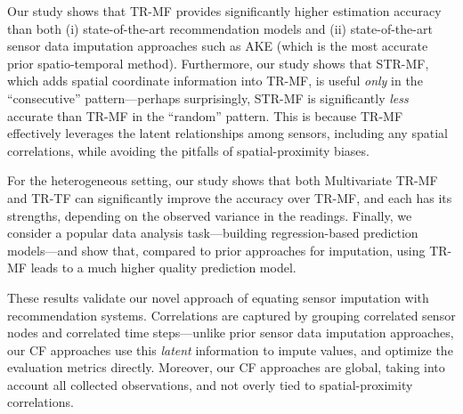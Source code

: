 Our study shows that TR-MF provides significantly higher estimation accuracy than 
both (i) state-of-the-art recommendation models and (ii) state-of-the-art sensor data imputation approaches 
such as AKE (which is the most accurate prior spatio-temporal method).
Furthermore, our study shows that STR-MF, which adds spatial coordinate information into TR-MF, 
is useful {\em only} in the ``consecutive'' pattern---perhaps surprisingly,
STR-MF is significantly {\em less} accurate than TR-MF in the ``random'' pattern.  This is because TR-MF
effectively leverages the latent relationships among sensors, including any spatial correlations, while avoiding the
pitfalls of spatial-proximity biases.

For the heterogeneous setting, our study shows that both
Multivariate TR-MF and TR-TF can significantly improve the accuracy over TR-MF,
and each has its strengths, depending on the observed variance in the
readings.  Finally, we consider a popular data analysis task---building regression-based prediction models---and show that,
compared to prior approaches for imputation, using TR-MF leads to a much higher quality prediction model.

These results validate our novel approach of equating sensor imputation with recommendation systems.  
Correlations are captured by grouping correlated sensor nodes and correlated time
steps---unlike prior sensor data imputation approaches, our CF
approaches use this {\em latent} information to impute values, and optimize the evaluation metrics directly. 
Moreover, our CF approaches are global, taking into account all
collected observations, and not overly tied to spatial-proximity
correlations.  


